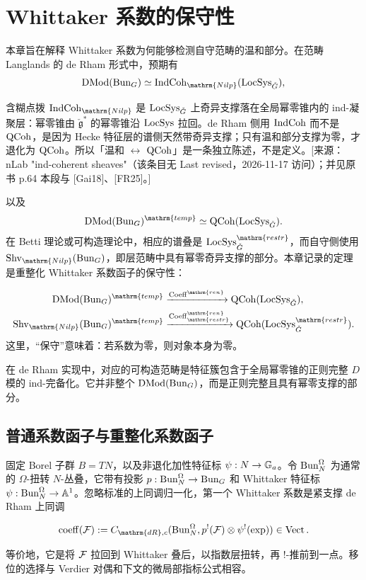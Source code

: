 \chapter{Whittaker 系数的保守性}\label{ch:13}
本章旨在解释 Whittaker 系数为何能够检测自守范畴的温和部分\cite{FR25,Gai18}。在范畴 Langlands 的 de Rham 形式中，预期有
\[\DMod(\Bun_G)\simeq\IndCoh_{\mathrm{Nilp}}(\LocSys_{\checkG}),\]

\begin{transnote}{含糊点拨}
$\IndCoh_{\mathrm{Nilp}}$ 是 $\operatorname{LocSys}_{\check G}$ 上奇异支撑落在全局幂零锥内的 ind-凝聚层：幂零锥由 $\check{\mathfrak g}^*$ 的幂零锥沿 $\operatorname{LocSys}$ 拉回。de Rham 侧用 $\operatorname{IndCoh}$ 而不是 $\operatorname{QCoh}$，是因为 Hecke 特征层的谱侧天然带奇异支撑；只有温和部分支撑为零，才退化为 $\operatorname{QCoh}$。所以「温和 $\leftrightarrow$ $\operatorname{QCoh}$」是一条独立陈述，不是定义。[来源：nLab "ind-coherent sheaves"（该条目无 Last revised，2026-11-17 访问）；并见原书 p.64 本段与 [Gai18]、[FR25]。]
\end{transnote}
以及
\[\DMod(\Bun_G)^{\mathrm{temp}}\simeq\QCoh(\LocSys_{\checkG}).\]
在 Betti 理论或可构造理论中，相应的谱叠是 $\LocSys^{\mathrm{restr}}_{\checkG}$，而自守侧使用 $\Shv_{\mathrm{Nilp}}(\Bun_G)$，即层范畴中具有幂零奇异支撑的部分。本章记录的定理是重整化 Whittaker 系数函子的保守性：
\begin{theorem*}{}
\[\begin{aligned}
\DMod(\Bun_G)^{\mathrm{temp}}&\xrightarrow{\operatorname{Coeff}^{\mathrm{ren}}}\QCoh(\LocSys_{\checkG}),\\
\Shv_{\mathrm{Nilp}}(\Bun_G)^{\mathrm{temp}}&\xrightarrow{\operatorname{Coeff}^{\mathrm{ren}}_{\mathrm{restr}}}\QCoh(\LocSys^{\mathrm{restr}}_{\checkG}).
\end{aligned}\]
这里，“保守”意味着：若系数为零，则对象本身为零。
\end{theorem*}
在 de Rham 实现中，对应的可构造范畴是特征簇包含于全局幂零锥的正则完整 $D$ 模的 ind-完备化。它并非整个 $\operatorname{DMod}(\operatorname{Bun}_G)$，而是正则完整且具有幂零支撑的部分。

\section{普通系数函子与重整化系数函子}\label{sec:13.1}
固定 Borel 子群 $B=TN$，以及非退化加性特征标 $\psi:N\to\mathbb{G}_{a}$。令 $\operatorname{Bun}_N^\Omega$ 为通常的 $\Omega$-扭转 $N$-丛叠，它带有投影 $p:\operatorname{Bun}_N^\Omega\to\operatorname{Bun}_G$ 和 Whittaker 特征标 $\psi:\operatorname{Bun}_N^\Omega\to\mathbb A^1$。忽略标准的上同调归一化，第一个 Whittaker 系数是紧支撑 de Rham 上同调
\begin{definition*}{}
\[\operatorname{coeff}(\cF):=C_{\mathrm{dR},c}(\Bun_N^\Omega,p^!(\cF)\otimes\psi^!(\exp))\in\operatorname{Vect}.\]
\end{definition*}
等价地，它是将 $\mathcal{F}$ 拉回到 Whittaker 叠后，以指数层扭转，再 $!$-推前到一点。移位的选择与 Verdier 对偶和下文的微局部指标公式相容。

